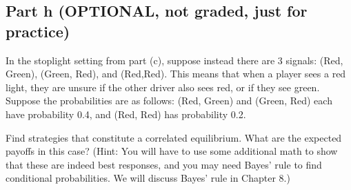 \documentclass[10pt]{article}
\begin{document}
\newpage

\subsection*{Part h (OPTIONAL, not graded, just for practice)} In the stoplight setting from part (c), suppose instead there are 3 signals: (Red, Green), (Green, Red), and (Red,Red). This means that when a player sees a red light, they are unsure if the other driver also sees red, or if they see green. Suppose the probabilities are as follows: (Red, Green) and (Green, Red) each have probability 0.4, and (Red, Red) has probability 0.2.

Find strategies that constitute a correlated equilibrium. What are the expected payoffs in this case? (Hint: You will have to use some additional math to show that these are indeed best responses, and you may need Bayes' rule to find conditional probabilities. We will discuss Bayes' rule in Chapter 8.)
\end{document}
